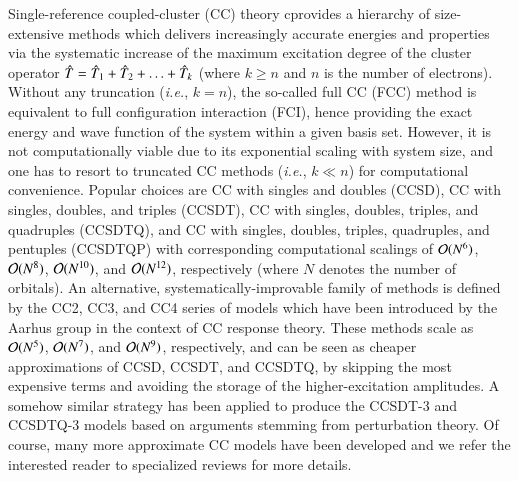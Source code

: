 \documentclass[aip,jcp,reprint,noshowkeys,superscriptaddress]{revtex4-1}
\newcommand{\ie}{\textit{i.e.}}
\newcommand{\hT}{\Hat{T}}
\begin{document}
Single-reference coupled-cluster (CC) theory cprovides a hierarchy of size-extensive methods which delivers increasingly accurate energies and properties via the systematic increase of the maximum excitation degree of the cluster operator $\hT = \hT_1 + \hT_2 + \ldots + \hT_k$ (where $k \ge n$ and $n$ is the number of electrons). \cite{Cizek_1966,Paldus_1972,Crawford_2000,Bartlett_2007,Shavitt_2009}
Without any truncation (\ie, $k = n$), the so-called full CC (FCC) method is equivalent to full configuration interaction (FCI), hence providing the exact energy and wave function of the system within a given basis set.
However, it is not computationally viable due to its exponential scaling with system size, and one has to resort to truncated CC methods  (\ie, $k \ll n$) for computational convenience.
Popular choices are CC with singles and doubles (CCSD), \cite{Cizek_1966,Purvis_1982} CC with singles, doubles, and triples (CCSDT), \cite{Noga_1987a,Scuseria_1988} CC with singles, doubles, triples, and quadruples (CCSDTQ), \cite{Oliphant_1991,Kucharski_1992} and 
CC with singles, doubles, triples, quadruples, and pentuples (CCSDTQP) \cite{Hirata_2000,Kallay_2001} with corresponding computational scalings of $\order*{N^{6}}$, $\order*{N^{8}}$,  $\order*{N^{10}}$, and  $\order*{N^{12}}$, respectively (where $N$ denotes the number of orbitals).
An alternative, systematically-improvable family of methods is defined by the CC2, \cite{Christiansen_1995a} CC3, \cite{Christiansen_1995b,Koch_1997} and CC4 \cite{Kallay_2005} series of models which have been introduced by the Aarhus group in the context of CC response theory. \cite{Christiansen_1998}
These methods scale as $\order*{N^{5}}$, $\order*{N^{7}}$, and $\order*{N^{9}}$, respectively, and can be seen as cheaper approximations of CCSD, CCSDT, and CCSDTQ, by skipping the most expensive terms and avoiding the storage of the higher-excitation amplitudes.
A somehow similar strategy has been applied to produce the CCSDT-3 \cite{Urban_1985,Noga_1987b} and CCSDTQ-3 \cite{Kallay_2005} models based on arguments stemming from perturbation theory.
Of course, many more approximate CC models have been developed and we refer the interested reader to specialized reviews for more details. \cite{Crawford_2000,Piecuch_2002,Bartlett_2007,Shavitt_2009}
\end{document}
